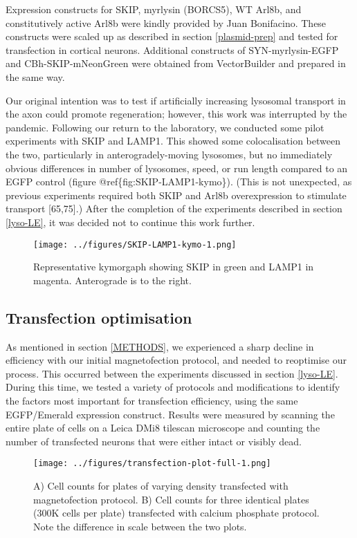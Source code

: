 \documentclass[
  12pt,
  a4paper,
]{book}
\begin{document}
Expression constructs for SKIP, myrlysin (BORCS5), WT Arl8b, and constitutively active Arl8b were kindly provided by Juan Bonifacino. These constructs were scaled up as described in section \ref{plasmid-prep} and tested for transfection in cortical neurons. Additional constructs of SYN-myrlysin-EGFP and CBh-SKIP-mNeonGreen were obtained from VectorBuilder and prepared in the same way.

Our original intention was to test if artificially increasing lysosomal transport in the axon could promote regeneration; however, this work was interrupted by the pandemic. Following our return to the laboratory, we conducted some pilot experiments with SKIP and LAMP1. This showed some colocalisation between the two, particularly in anterogradely-moving lysosomes, but no immediately obvious differences in number of lysosomes, speed, or run length compared to an EGFP control (figure @ref\{fig:SKIP-LAMP1-kymo\}). (This is not unexpected, as previous experiments required both SKIP and Arl8b overexpression to stimulate transport {[}65,75{]}.) After the completion of the experiments described in section \ref{lyso-LE}, it was decided not to continue this work further.

\begin{figure}
\centering
\texttt{[image: ../figures/SKIP-LAMP1-kymo-1.png]}
\caption{\label{fig:SKIP-LAMP1-kymo}Representative kymorgaph showing SKIP in green and LAMP1 in magenta. Anterograde is to the right.}
\end{figure}

\hypertarget{transfection-optimisation}{%
\subsection{Transfection optimisation}\label{transfection-optimisation}}

As mentioned in section \ref{METHODS}, we experienced a sharp decline in efficiency with our initial magnetofection protocol, and needed to reoptimise our process. This occurred between the experiments discussed in section \ref{lyso-LE}. During this time, we tested a variety of protocols and modifications to identify the factors most important for transfection efficiency, using the same EGFP/Emerald expression construct. Results were measured by scanning the entire plate of cells on a Leica DMi8 tilescan microscope and counting the number of transfected neurons that were either intact or visibly dead.

\begin{figure}
\centering
\texttt{[image: ../figures/transfection-plot-full-1.png]}
\caption{\label{fig:transfection-plot-full}A) Cell counts for plates of varying density transfected with magnetofection protocol. B) Cell counts for three identical plates (300K cells per plate) transfected with calcium phosphate protocol. Note the difference in scale between the two plots.}
\end{figure}
\end{document}
